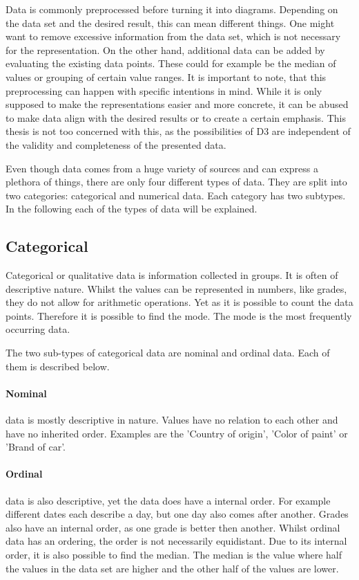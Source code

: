 Data is commonly preprocessed before turning it into diagrams. Depending on the data set and the desired result, this can mean different things. One might want to remove excessive information from the data set, which is not necessary for the representation. On the other hand, additional data can be added by evaluating the existing data points. These could for example be the median of values or grouping of certain value ranges\cite{garcia2015data}. It is important to note, that this preprocessing can happen with specific intentions in mind. While it is only supposed to make the representations easier and more concrete, it can be abused to make data align with the desired results or to create a certain emphasis. This thesis is not too concerned with this, as the possibilities of D3 are independent of the validity and completeness of the presented data.

Even though data comes from a huge variety of sources and can express a plethora of things, there are only four different types of data\cite{henze_2021}. They are split into two categories: categorical and numerical data. Each category has two subtypes. In the following each of the types of data will be explained.

\subsection{Categorical}

Categorical or qualitative data is information collected in groups. It is often of descriptive nature. Whilst the values can be represented in numbers, like grades, they do not allow for arithmetic operations. Yet as it is possible to count the data points. Therefore it is possible to find the mode. The mode is the most frequently occurring data.

The two sub-types of categorical data are nominal and ordinal data. Each of them is described below.

\paragraph{Nominal}
data is mostly descriptive in nature. Values have no relation to each other and have no inherited order. Examples are the 'Country of origin', 'Color of paint' or 'Brand of car'.

\paragraph{Ordinal}
data is also descriptive, yet the data does have a internal order. For example different dates each describe a day, but one day also comes after another. Grades also have an internal order, as one grade is better then another. Whilst ordinal data has an ordering, the order is not necessarily equidistant. Due to its internal order, it is also possible to find the median. The median is the value where half the values in the data set are higher and the other half of the values are lower.

